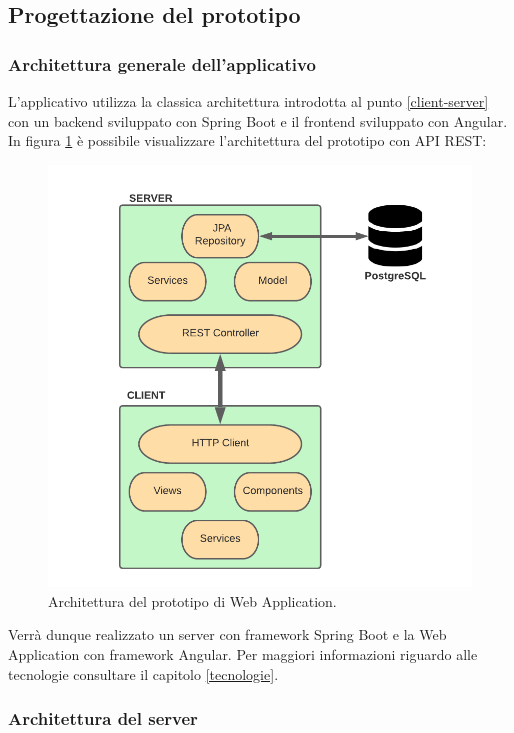 \subsection{Progettazione del prototipo}
\subsubsection*{Architettura generale dell'applicativo}
L'applicativo utilizza la classica architettura introdotta al punto \ref{client-server} con un backend sviluppato con Spring Boot e il frontend sviluppato con Angular. In figura \ref{prototype-architecture} è possibile visualizzare l'architettura del prototipo con API REST:
\begin{figure}[!h]
\centering
\includegraphics[width=0.6\linewidth]{immagini/prototype_architecture.pdf}
\caption{Architettura del prototipo di Web Application.}
\label{prototype-architecture}
\end{figure}
Verrà dunque realizzato un server con framework Spring Boot e la Web Application con framework Angular. Per maggiori informazioni riguardo alle tecnologie consultare il capitolo \ref{tecnologie}.
\subsubsection*{Architettura del server}

